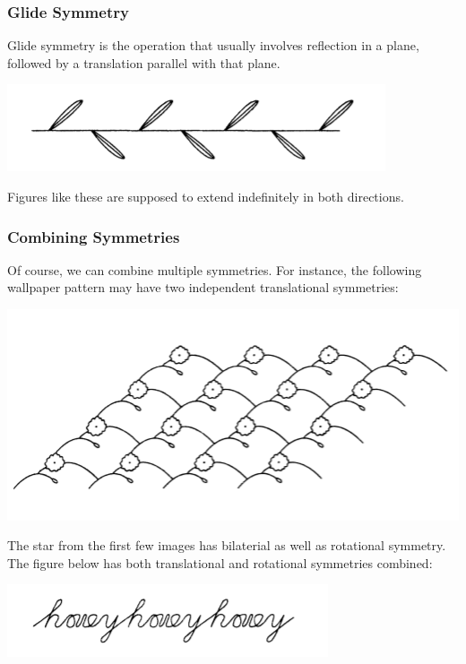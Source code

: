 \documentclass[letterpaper]{article}
\begin{document}
\subsubsection{Glide Symmetry}
Glide symmetry is the operation that usually involves reflection in a plane, followed by a translation parallel with that plane. 
\begin{center}
    \includegraphics[scale=0.8]{assets/glide_sym.png}
\end{center}
Figures like these are supposed to extend indefinitely in both directions.

\subsubsection{Combining Symmetries}
Of course, we can combine multiple symmetries. For instance, the following wallpaper pattern may have two independent translational symmetries: 
\begin{center}
    \includegraphics[scale=0.8]{assets/wallpaper.png}
\end{center}
The star from the first few images has bilaterial as well as rotational symmetry. The figure below has both translational and rotational symmetries combined: 
\begin{center}
    \includegraphics[scale=0.8]{assets/honey.png}
\end{center}
\end{document}
